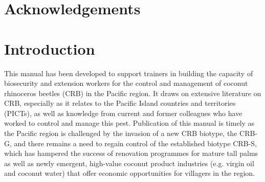 \documentclass[twocolumn,letterpaper]{scrartcl}
\begin{document}
%
%
%
%
%
%
%

\section{Acknowledgements}
%
%
%

\section{Introduction} 

This  manual  has  been  developed  to  support  trainers  in  building  the  capacity  of  biosecurity  and  extension 
workers for the control and management of coconut rhinoceros beetles (CRB) in the Pacific region. It draws on 
extensive literature on CRB, especially as it relates to the Pacific Island countries and territories (PICTs), as well as 
knowledge from current and former colleagues who have worked to control and manage this pest. Publication 
of this manual is timely as the Pacific region is challenged by the invasion of a new CRB biotype, the CRB-G, and 
there remains a need to regain control of the established biotype CRB-S, which has hampered the success of 
renovation programmes for mature tall palms as well as newly emergent, high-value coconut product industries 
(e.g. virgin oil and coconut water) that offer economic opportunities for villagers in the region.
\end{document}
